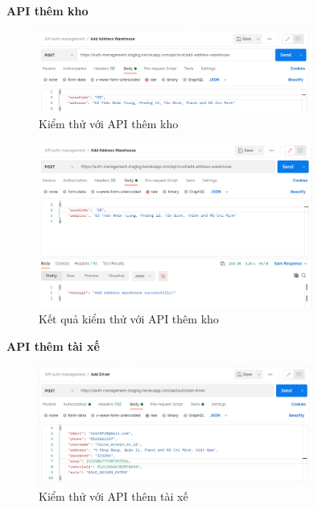 		\textbf{API thêm kho}
		
		\begin{figure}[!ht]
			\includegraphics[width=0.8\textwidth]{Images/testing/API-add-address-warehouse.png}
			\centering
			\linebreak
			\caption{Kiểm thử với API thêm kho}
		\end{figure}
		
		\begin{figure}[!ht]
			\includegraphics[width=0.8\textwidth]{Images/testing/API-add-address-warehouse-result.png}
			\centering
			\linebreak
			\caption{Kết quả kiểm thử với API thêm kho}
		\end{figure}
		
		\newpage	
		
		\textbf{API thêm tài xế}
		
		\begin{figure}[!ht]
			\includegraphics[width=0.8\textwidth]{Images/testing/API-add-driver.png}
			\centering
			\linebreak
			\caption{Kiểm thử với API thêm tài xế}
		\end{figure}
		
